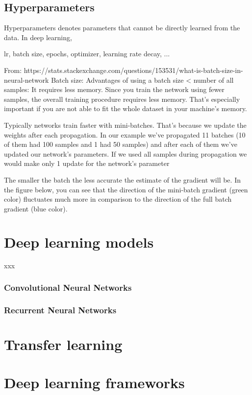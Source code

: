 \subsection{Hyperparameters}
Hyperparameters denotes parameters that cannot be directly learned from the data. In deep learning,

lr, batch size, epochs, optimizer, learning rate decay, ...


From: https://stats.stackexchange.com/questions/153531/what-is-batch-size-in-neural-network
Batch size: 
Advantages of using a batch size < number of all samples:
It requires less memory. Since you train the network using fewer samples, the overall training procedure requires less memory. That's especially important if you are not able to fit the whole dataset in your machine's memory.

Typically networks train faster with mini-batches. That's because we update the weights after each propagation. In our example we've propagated 11 batches (10 of them had 100 samples and 1 had 50 samples) and after each of them we've updated our network's parameters. If we used all samples during propagation we would make only 1 update for the network's parameter


The smaller the batch the less accurate the estimate of the gradient will be. In the figure below, you can see that the direction of the mini-batch gradient (green color) fluctuates much more in comparison to the direction of the full batch gradient (blue color).


\section{Deep learning models}
xxx

\subsubsection{Convolutional Neural Networks}


\subsubsection{Recurrent Neural Networks}




\section{Transfer learning}




\section{Deep learning frameworks}